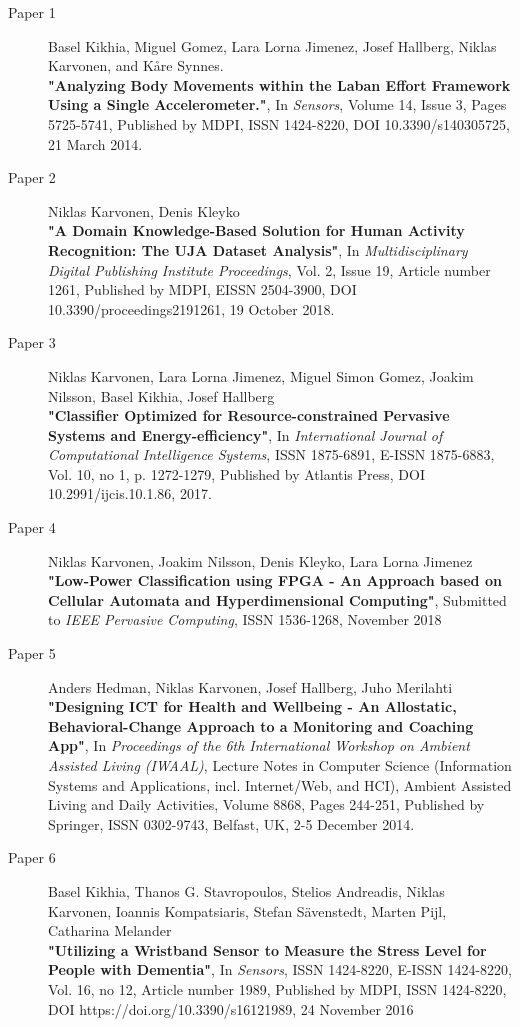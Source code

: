 \documentclass{article}
\begin{document}
\begin{description}
\item[Paper 1]
Basel Kikhia, Miguel Gomez, Lara Lorna Jimenez, Josef Hallberg, Niklas Karvonen, and K\aa re Synnes.\\
{\bf "Analyzing Body Movements within the Laban Effort Framework Using a Single Accelerometer."}, 
In {\it Sensors}, Volume 14, Issue 3, Pages 5725-5741, 
Published by MDPI, ISSN 1424-8220, 
DOI 10.3390/s140305725, 
21 March 2014.

\item[Paper 2]
Niklas Karvonen, Denis Kleyko\\
{\bf "A Domain Knowledge-Based Solution for Human Activity Recognition: The UJA Dataset Analysis"}, 
In {\it Multidisciplinary Digital Publishing Institute Proceedings}, Vol. 2, Issue 19, Article number 1261, 
Published by MDPI, EISSN 2504-3900, 
DOI 10.3390/proceedings2191261, 
19 October 2018.

\item[Paper 3]
Niklas Karvonen, Lara Lorna Jimenez, Miguel Simon Gomez, Joakim Nilsson, Basel Kikhia, Josef Hallberg
{\\\bf "Classifier Optimized for Resource-constrained Pervasive Systems and Energy-efficiency"}, 
In {\it International Journal of Computational Intelligence Systems}, ISSN 1875-6891, E-ISSN 1875-6883, Vol. 10, no 1, p. 1272-1279, 
Published by Atlantis Press, 
DOI 10.2991/ijcis.10.1.86, 
2017.

\item[Paper 4]
Niklas Karvonen, Joakim Nilsson, Denis Kleyko, Lara Lorna Jimenez
{\\\bf "Low-Power Classification using FPGA - An Approach based on Cellular Automata and Hyperdimensional Computing"}, Submitted to {\it IEEE Pervasive Computing}, ISSN 1536-1268, 
November 2018

\item[Paper 5]
Anders Hedman, Niklas Karvonen, Josef Hallberg, Juho Merilahti
{\\\bf "Designing ICT for Health and Wellbeing - An Allostatic, Behavioral-Change Approach to a Monitoring and Coaching App"}, 
In {\it Proceedings of the 6th International Workshop on Ambient Assisted Living (IWAAL)}, Lecture Notes in Computer Science (Information Systems and Applications, incl. Internet/Web, and HCI), Ambient Assisted Living and Daily Activities, Volume 8868, Pages 244-251, 
Published by Springer, ISSN 0302-9743, Belfast, UK, 
2-5 December 2014.

\item[Paper 6]
Basel Kikhia, Thanos G. Stavropoulos, Stelios Andreadis, Niklas Karvonen, Ioannis Kompatsiaris, Stefan Sävenstedt, Marten Pijl, Catharina Melander\\
{\bf "Utilizing a Wristband Sensor to Measure the Stress Level for People with Dementia"}, 
In {\it Sensors}, ISSN 1424-8220, E-ISSN 1424-8220, Vol. 16, no 12, Article number 1989,
Published by MDPI, ISSN 1424-8220,
DOI https://doi.org/10.3390/s16121989,
24 November 2016


\end{description}
\end{document}
